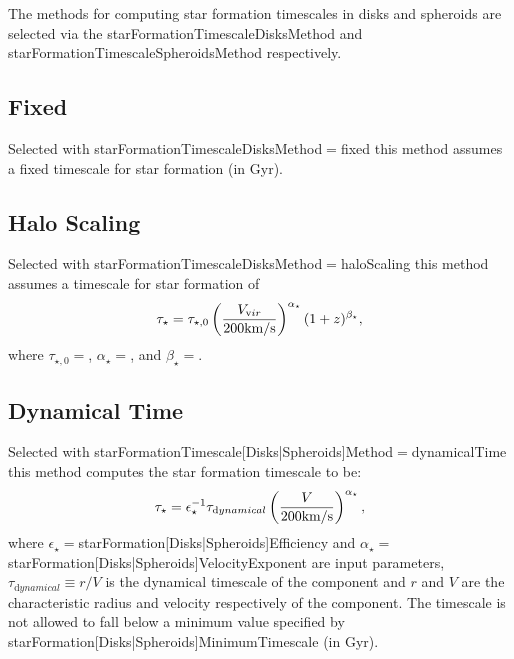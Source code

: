 The methods for computing star formation timescales in disks and spheroids are selected via the {\normalfont \ttfamily starFormationTimescaleDisksMethod} and {\normalfont \ttfamily starFormationTimescaleSpheroidsMethod} respectively.

\subsection{Fixed}

Selected with {\normalfont \ttfamily starFormationTimescaleDisksMethod}$=${\normalfont \ttfamily fixed} this method assumes a fixed timescale for star formation {\normalfont \ttfamily [starFormationTimescaleDisksFixedTimescale]} (in Gyr).

\subsection{Halo Scaling}

Selected with {\normalfont \ttfamily starFormationTimescaleDisksMethod}$=${\normalfont \ttfamily haloScaling} this method assumes a timescale for star formation of
\begin{equation}
 \tau_\star = \tau_{\mathrm \star,0} \left( {V_{\mathrm vir} \over 200\hbox{km/s}} \right)^{\alpha_\star} (1+z)^{\beta_\star},
\end{equation}
where $\tau_{\mathrm \star,0}=${\normalfont \ttfamily [starFormationTimescaleDisksHaloScalingTimescale]}, $\alpha_\star=${\normalfont \ttfamily [starFormationTimescaleDisksHaloScalingVirialVelocityExponent]}, and $\beta_\star=${\normalfont \ttfamily [starFormationTimescaleDisksHaloScalingRedshiftExponent]}.

\subsection{Dynamical Time}

Selected with {\normalfont \ttfamily starFormationTimescale[Disks|Spheroids]Method}$=${\normalfont \ttfamily dynamicalTime} this method computes the star formation timescale to be:
\begin{equation}
 \tau_\star = \epsilon_\star^{-1} \tau_{\mathrm dynamical} \left( {V \over 200\hbox{km/s}} \right)^{\alpha_\star},
\end{equation}
where $\epsilon_\star=${\normalfont \ttfamily starFormation[Disks|Spheroids]Efficiency} and $\alpha_\star=${\normalfont \ttfamily starFormation[Disks|Spheroids]VelocityExponent} are input parameters, $\tau_{\mathrm dynamical}\equiv r/V$ is the dynamical timescale of the \gls{component} and $r$ and $V$ are the characteristic radius and velocity respectively of the component. The timescale is not allowed to fall below a minimum value specified by {\normalfont \ttfamily starFormation[Disks|Spheroids]MinimumTimescale} (in Gyr).

